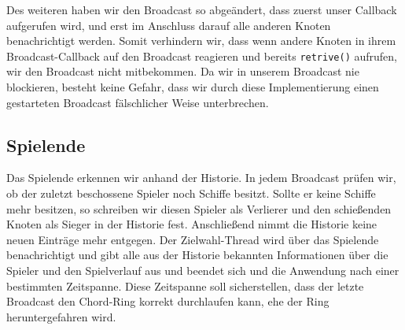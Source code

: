Des weiteren haben wir den Broadcast so abgeändert, dass zuerst unser Callback aufgerufen wird, und erst im Anschluss darauf alle anderen Knoten benachrichtigt werden. Somit verhindern wir, dass wenn andere Knoten in ihrem Broadcast-Callback auf den Broadcast reagieren und bereits \texttt{retrive()} aufrufen, wir den Broadcast nicht mitbekommen. Da wir in unserem Broadcast nie blockieren, besteht keine Gefahr, dass wir durch diese Implementierung einen gestarteten Broadcast fälschlicher Weise unterbrechen.\\

\subsection{Spielende}
Das Spielende erkennen wir anhand der Historie. In jedem Broadcast prüfen wir, ob der zuletzt beschossene Spieler noch Schiffe besitzt. Sollte er keine Schiffe mehr besitzen, so schreiben wir diesen Spieler als Verlierer und den schießenden Knoten als Sieger in der Historie fest. Anschließend nimmt die Historie keine neuen Einträge mehr entgegen. Der Zielwahl-Thread wird über das Spielende benachrichtigt und gibt alle aus der Historie bekannten Informationen über die Spieler und den Spielverlauf aus und beendet sich und die Anwendung nach einer bestimmten Zeitspanne. Diese Zeitspanne soll sicherstellen, dass der letzte Broadcast den Chord-Ring korrekt durchlaufen kann, ehe der Ring heruntergefahren wird. 







